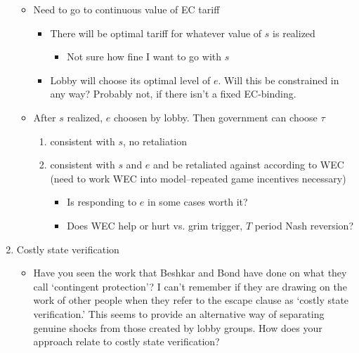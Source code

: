 \documentclass[12pt]{article}
\begin{document}
\begin{enumerate}
\begin{itemize}
\begin{itemize}
				\end{itemize}
			\item Need to go to continuous value of EC tariff
				\begin{itemize}
					\item There will be optimal tariff for whatever value of $s$ is realized
						\begin{itemize}
							\item Not sure how fine I want to go with $s$
						\end{itemize}
					\item Lobby will choose its optimal level of $e$. Will this be constrained in any way? Probably not, if there isn't a fixed EC-binding.
				\end{itemize}
			\item After $s$ realized, $e$ choosen by lobby. Then government can choose $\tau$
				\begin{enumerate}
					\item consistent with $s$, no retaliation
					\item consistent with $s$ and $e$ and be retaliated against according to WEC (need to work WEC into model--repeated game incentives necessary)
						\begin{itemize}
							\item Is responding to $e$ in some cases worth it?
							\item Does WEC help or hurt vs. grim trigger, $T$ period Nash reversion?
						\end{itemize}
				\end{enumerate}
		\end{itemize}
	\item Costly state verification
		\begin{itemize}
				\item Have you seen the work that Beshkar and Bond have done on what they call `contingent protection'?  I can't remember if they are drawing on the work of other people when they refer to the escape clause as `costly state verification.'  This seems to provide an alternative way of separating genuine shocks from those created by lobby groups.  How does your approach relate to costly state verification?
		\end{itemize}


\end{enumerate}
\end{document}
